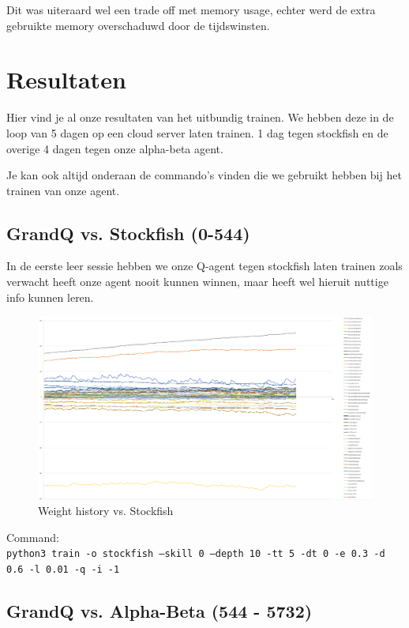 \documentclass[a4paper,openany]{uantwerpenassignment}
\newcommand{\codeword}[1]{
    \colorbox{code}{\texttt{\textcolor{codetext}{#1}}}
}
\begin{document}
Dit was uiteraard wel een trade off met memory usage, echter werd de extra gebruikte memory overschaduwd door de tijdswinsten.

\chapter{Resultaten}

Hier vind je al onze resultaten van het uitbundig trainen. We hebben deze in de loop van 5 dagen op een cloud server laten trainen. 1 dag tegen stockfish en de overige 4 dagen tegen onze alpha-beta agent.

Je kan ook altijd onderaan de commando's vinden die we gebruikt hebben bij het trainen van onze agent.

\section{GrandQ vs. Stockfish (0-544)}

In de eerste leer sessie hebben we onze Q-agent tegen stockfish laten trainen zoals verwacht heeft onze agent nooit kunnen winnen, maar heeft wel hieruit nuttige info kunnen leren.

\begin{figure}[h]
    \centering
    \includegraphics[width=\textwidth]{images/stockfish.png}
    \caption{Weight history vs. Stockfish}
    \label{fig:stockfish}
\end {figure}

Command:\\
\codeword{python3 train -o stockfish --skill 0 --depth 10 -tt 5 -dt 0 -e 0.3 -d 0.6 -l 0.01 -q -i -1}
\pagebreak

\section{GrandQ vs. Alpha-Beta (544 - 5732)}
\end{document}
